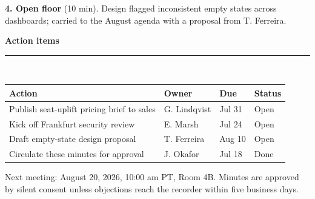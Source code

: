 \documentclass[10pt]{article}
\newcommand{\sectionrule}[1]{%
  \vspace{14pt}
  {\large\bfseries\color{accent}#1}\\[-4pt]
  {\color{accent}\rule{\linewidth}{1pt}}\\[4pt]}
\begin{document}
{\bfseries 4. Open floor} (10 min).
Design flagged inconsistent empty states across dashboards; carried to the
August agenda with a proposal from T. Ferreira.

\sectionrule{Action items}

\begin{tabularx}{\textwidth}{@{}Xlll@{}}
  \toprule
  \rowcolor{white}
  {\bfseries Action} & {\bfseries Owner} & {\bfseries Due} & {\bfseries Status}\\
  \midrule
  Publish seat-uplift pricing brief to sales & G. Lindqvist & Jul 31 & Open\\
  Kick off Frankfurt security review & E. Marsh & Jul 24 & Open\\
  Draft empty-state design proposal & T. Ferreira & Aug 10 & Open\\
  Circulate these minutes for approval & J. Okafor & Jul 18 & Done\\
  \bottomrule
\end{tabularx}

\vspace{14pt}
{\color{inkgray}\small Next meeting: August 20, 2026, 10:00 am PT, Room 4B.
Minutes are approved by silent consent unless objections reach the recorder
within five business days.}
\end{document}
